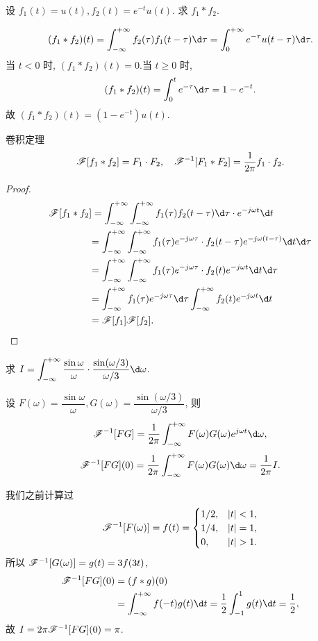\begin{example}
	设 $f_1(t)=u(t),f_2(t)=e^{-t}u(t)$. 求 $f_1\ast f_2$.
\end{example}
\begin{solution}
	\[(f_1\ast f_2)(t)=\int_{-\infty}^{+\infty} f_2(\tau)f_1(t-\tau)\d \tau=\int_0^{+\infty} e^{-\tau}u(t-\tau)\d \tau.\]
	当 $t<0$ 时, $(f_1\ast f_2)(t)=0$.当 $t\ge0$ 时, 
		\[(f_1\ast f_2)(t)=\int_0^t e^{-\tau}\d \tau=1-e^{-t}.\]
	故 $(f_1\ast f_2)(t)=(1-e^{-t})u(t)$.
\end{solution}

\begin{theorem}{卷积定理}
	\[\mathscr{F}[f_1\ast f_2]=F_1\cdot F_2,\quad
	\mathscr{F}^{-1}[F_1\ast F_2]=\frac1{2\pi}f_1\cdot f_2.\]
\end{theorem}

\begin{proof}
	\begin{align*}
		\msf[f_1\ast f_2]&=\int_{-\infty}^{+\infty}\int_{-\infty}^{+\infty}f_1(\tau)f_2(t-\tau)\d \tau \cdot e^{-j\omega t}\d t\\
		&{=\int_{-\infty}^{+\infty}\int_{-\infty}^{+\infty}f_1(\tau)e^{-j\omega \tau}\cdot f_2(t-\tau)e^{-j\omega (t-\tau)}\d t\d \tau}\\
		&{=\int_{-\infty}^{+\infty}\int_{-\infty}^{+\infty}f_1(\tau)e^{-j\omega \tau}\cdot f_2(t)e^{-j\omega t}\d t\d \tau}\\
		&{=\int_{-\infty}^{+\infty}f_1(\tau)e^{-j\omega \tau}\d\tau\int_{-\infty}^{+\infty}f_2(t)e^{-j\omega t}\d t}\\
		&{=\msf[f_1]\msf[f_2].\qedhere}
	\end{align*}
\end{proof}

\begin{example}
	求 $\displaystyle	I=\int_{-\infty}^{+\infty}\frac{\sin \omega}{\omega}\cdot \frac{\sin (\omega/3)}{\omega/3}\d\omega$.
\end{example}

\begin{solution}
		设 $F(\omega)=\dfrac{\sin\omega}{\omega},G(\omega)=\dfrac{\sin(\omega/3)}{\omega/3}$,%
	{则
		\[\msf^{-1}[FG]=\frac1{2\pi}\int_{-\infty}^{+\infty}F(\omega)G(\omega)e^{j\omega t}\d\omega,\]
		\[\msf^{-1}[FG](0)=\frac1{2\pi}\int_{-\infty}^{+\infty}F(\omega)G(\omega)\d\omega=\frac1{2\pi}I.\]
	}

		我们之前计算过
		\[\msf^{-1}[F(\omega)]=f(t)=\begin{cases}
			1/2, & |t|<1,\\
			1/4, & |t|=1,\\
			0, & |t|>1.
		\end{cases}\]
	{所以 $\mathscr{F}^{-1}[G(\omega)]=g(t)=3f(3t)$,
		\begin{align*}
			\msf^{-1}[FG](0)&=(f\ast g)(0)\\
			&=\int_{-\infty}^{+\infty}f(-t)g(t)\d t=\half\int_{-1}^1 g(t)\d t=\half ,
		\end{align*}故 $I=2\pi\mathscr{F}^{-1}[FG](0)=\pi$.}
\end{solution}

